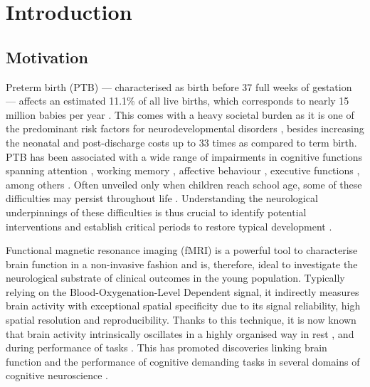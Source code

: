 \cleardoublepage

\chapter{Introduction}



\section{Motivation}

Preterm birth  (PTB) --- characterised as birth before 37 full weeks of gestation --- affects an estimated 11.1\% of all live births, which corresponds to nearly 15 million babies per year \citep{Blencowe2013}. 
This comes with a heavy societal burden as it is one of the predominant risk factors for neurodevelopmental disorders \citep{Twilhaar2018}, besides increasing the neonatal and post-discharge costs up to 33 times \citep{Tommiska2003} as compared to term birth. %
PTB has been associated with a wide range of impairments in cognitive functions spanning attention \citep{Rommel2017}, working memory \citep{Allotey2018}, affective behaviour \citep{Hornman2016}, executive functions \citep{Costa2017, Burnett2018}, among others \citep{Moreira2014, Allotey2018}. 
Often unveiled only when children reach school age, some of these difficulties may persist throughout life \citep{Anderson2014, Kajantie2019}. Understanding the neurological underpinnings of these difficulties is thus crucial to identify potential interventions and establish critical periods to restore typical development \citep{Wolke2019}.

 Functional magnetic resonance imaging (fMRI) is a powerful tool to characterise brain function in a non-invasive fashion and is, therefore, ideal to investigate the neurological substrate of clinical outcomes in the young population. Typically relying on the Blood-Oxygenation-Level Dependent signal, it indirectly measures brain activity with exceptional spatial specificity due to its signal reliability, high spatial resolution and reproducibility. Thanks to this technique, it is now known that brain activity intrinsically oscillates in a highly organised way in rest \citep{Damoiseaux2006}, and during performance of tasks \citep{Elliott2019}. This has promoted discoveries linking brain function and the performance of cognitive demanding tasks in several domains of cognitive neuroscience \citep{Raichle2001, Poldrack2012, DEsposito2016}. 
 
